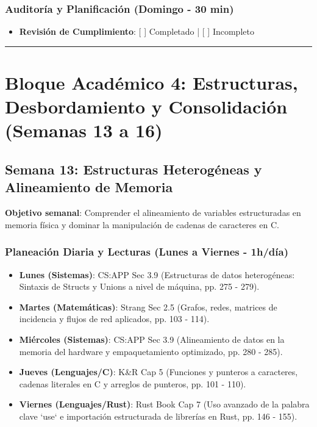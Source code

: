 \documentclass[11pt, a4paper]{article}
\begin{document}
\subsubsection{Auditoría y Planificación (Domingo - 30 min)}
\begin{itemize}
    \item \textbf{Revisión de Cumplimiento}: [ ] Completado | [ ] Incompleto
\end{itemize}

\noindent\rule{\textwidth}{0.4pt}
\newpage

\section{Bloque Académico 4: Estructuras, Desbordamiento y Consolidación (Semanas 13 a 16)}

\subsection{Semana 13: Estructuras Heterogéneas y Alineamiento de Memoria}
\textbf{Objetivo semanal}: Comprender el alineamiento de variables estructuradas en memoria física y dominar la manipulación de cadenas de caracteres en C.

\subsubsection{Planeación Diaria y Lecturas (Lunes a Viernes - 1h/día)}
\begin{itemize}
    \item \textbf{Lunes (Sistemas)}: CS:APP Sec 3.9 (Estructuras de datos heterogéneas: Sintaxis de Structs y Unions a nivel de máquina, pp. 275 - 279).
    \item \textbf{Martes (Matemáticas)}: Strang Sec 2.5 (Grafos, redes, matrices de incidencia y flujos de red aplicados, pp. 103 - 114).
    \item \textbf{Miércoles (Sistemas)}: CS:APP Sec 3.9 (Alineamiento de datos en la memoria del hardware y empaquetamiento optimizado, pp. 280 - 285).
    \item \textbf{Jueves (Lenguajes/C)}: K\&R Cap 5 (Funciones y punteros a caracteres, cadenas literales en C y arreglos de punteros, pp. 101 - 110).
    \item \textbf{Viernes (Lenguajes/Rust)}: Rust Book Cap 7 (Uso avanzado de la palabra clave `use` e importación estructurada de librerías en Rust, pp. 146 - 155).
\end{itemize}
\end{document}
